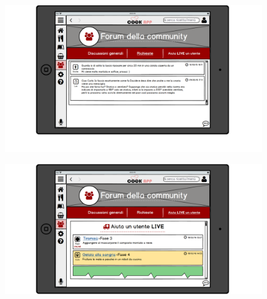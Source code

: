 \begin{figure}[H]
	\centering
	\includegraphics[width=0.95\linewidth]{img/mockup/Community4.png}
\end{figure}
\begin{figure}[H]
	\centering
	\includegraphics[width=0.95\linewidth]{img/mockup/Community5.png}
\end{figure}

